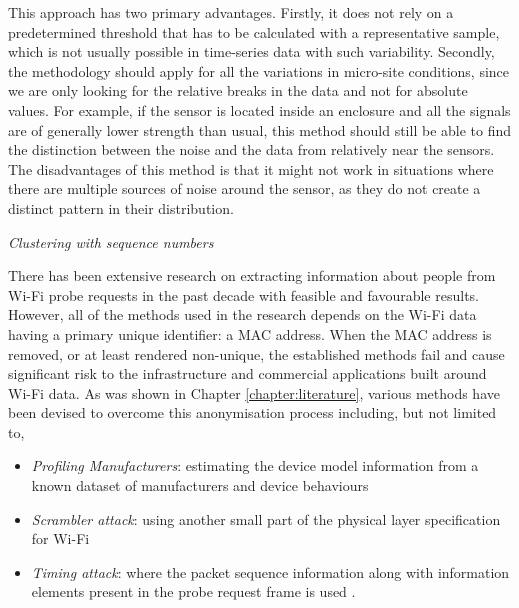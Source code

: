 This approach has two primary advantages.
Firstly, it does not rely on a predetermined threshold that has to be calculated with a representative sample, which is not usually possible in time-series data with such variability.
Secondly, the methodology should apply for all the variations in micro-site conditions, since we are only looking for the relative breaks in the data and not for absolute values.
For example, if the sensor is located inside an enclosure and all the signals are of generally lower strength than usual, this method should still be able to find the distinction between the noise and the data from relatively near the sensors.
The disadvantages of this method is that it might not work in situations where there are multiple sources of noise around the sensor, as they do not create a distinct pattern in their distribution.

\vspace{1.5em}\noindent\textit{Clustering with sequence numbers}\vspace{0.5em}

There has been extensive research on extracting information about people from Wi-Fi probe requests in the past decade with feasible and favourable results.
However, all of the methods used in the research depends on the Wi-Fi data having a primary unique identifier: a MAC address.
When the MAC address is removed, or at least rendered non-unique, the established methods fail and cause significant risk to the infrastructure and commercial applications built around Wi-Fi data.
As was shown in Chapter \ref{chapter:literature}, various methods have been devised to overcome this anonymisation process including, but not limited to,

\begin{itemize}[rightmargin=2em, leftmargin=2em]
  \itemsep-0.25cm
  \item \textit{Profiling Manufacturers}: estimating the device model information from a known dataset of manufacturers and device behaviours \citep{martin2016}
  \item \textit{Scrambler attack}: using another small part of the physical layer specification for Wi-Fi \citep{vo2016, bloessl2015}
  \item \textit{Timing attack}: where the packet sequence information along with information elements present in the probe request frame is used \citep{matte2016, cheng2016}. 
\end{itemize}

